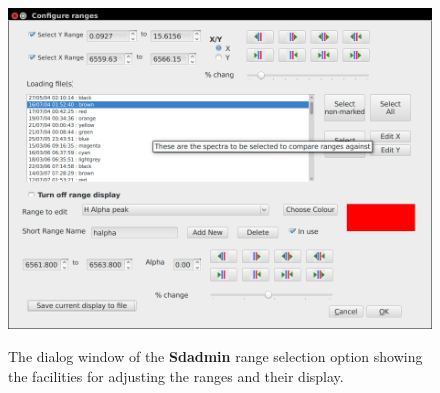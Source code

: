 \begin{figure}[!htbp]
\begin{center}
\includegraphics[scale=0.4]{Figures/sdadmindlg.png} \\
\end{center}   
\caption{The dialog window of the \textbf{Sdadmin} range selection option showing the facilities for adjusting the
  ranges and their display.}
 \protect\label{fig:sdadmindlg}
\end{figure}
